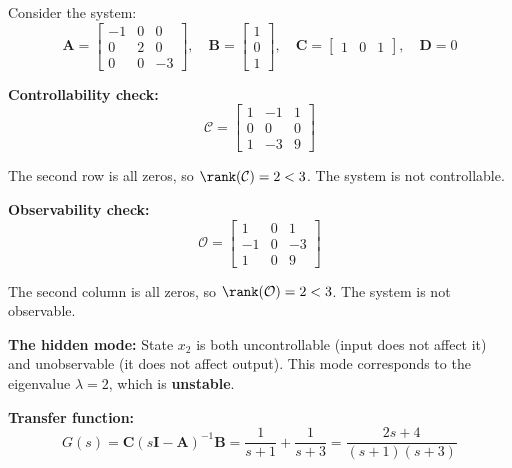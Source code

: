 
\begin{example}
\label{ex:hidden_mode}
Consider the system:
\begin{equation}
\mathbf{A} = \begin{bmatrix} -1 & 0 & 0 \\ 0 & 2 & 0 \\ 0 & 0 & -3 \end{bmatrix}, \quad
\mathbf{B} = \begin{bmatrix} 1 \\ 0 \\ 1 \end{bmatrix}, \quad
\mathbf{C} = \begin{bmatrix} 1 & 0 & 1 \end{bmatrix}, \quad
\mathbf{D} = 0
\end{equation}

\textbf{Controllability check:}
\begin{equation}
\mathcal{C} = \begin{bmatrix} 1 & -1 & 1 \\ 0 & 0 & 0 \\ 1 & -3 & 9 \end{bmatrix}
\end{equation}

The second row is all zeros, so $\rank(\mathcal{C}) = 2 < 3$. The system is not controllable.

\textbf{Observability check:}
\begin{equation}
\mathcal{O} = \begin{bmatrix} 1 & 0 & 1 \\ -1 & 0 & -3 \\ 1 & 0 & 9 \end{bmatrix}
\end{equation}

The second column is all zeros, so $\rank(\mathcal{O}) = 2 < 3$. The system is not observable.

\textbf{The hidden mode:} State $x_2$ is both uncontrollable (input does not affect it) and unobservable (it does not affect output). This mode corresponds to the eigenvalue $\lambda = 2$, which is \textbf{unstable}.

\textbf{Transfer function:}
\begin{equation}
G(s) = \mathbf{C}(s\mathbf{I} - \mathbf{A})^{-1}\mathbf{B} = \frac{1}{s+1} + \frac{1}{s+3} = \frac{2s + 4}{(s+1)(s+3)}
\end{equation}


\end{example}
